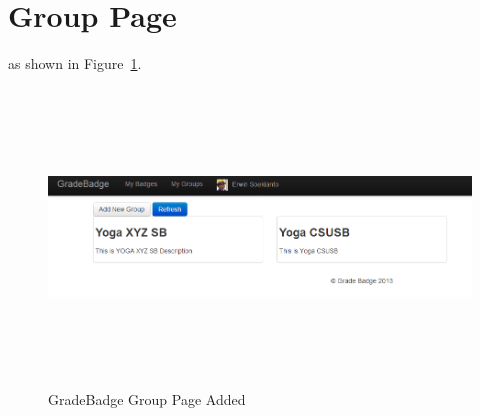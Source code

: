 \newpage
\section{Group Page}
 as shown in Figure~\ref{fig:group-page2}. 

\vspace{3em}
\begin{figure}[H]
\begin{center}
\includegraphics[height=3.1in,width=6.5in]{images/group-page2.png}
\caption{GradeBadge Group Page Added}
\label{fig:group-page2}
\end{center}
\end{figure}


